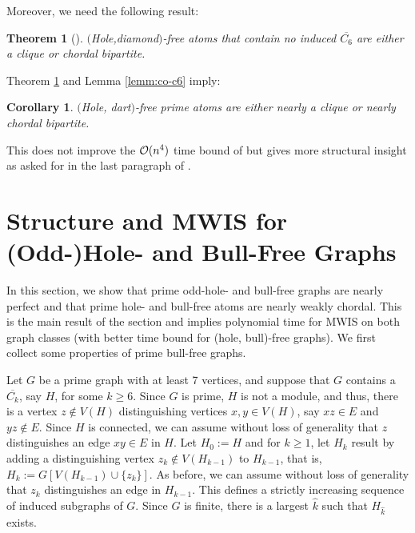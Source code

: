 \documentclass[11pt]{article}
\newcommand{\0}{\text{ has a co-join to }}
\newcommand{\1}{\text{ has a join to }}
\newtheorem{theo}{Theorem}
\newtheorem{coro}{Corollary}
\begin{document}
Moreover, we need the following result:

\begin{theo}[\cite{BerBraGiaMaf2012}]\label{holediamondcoC6freeatoms}   
$($Hole,diamond$)$-free atoms that contain no induced $\overline{C_6}$ are either a clique or chordal bipartite. 
\end{theo}

Theorem \ref{holediamondcoC6freeatoms} and Lemma \ref{lemm:co-c6} imply: 

\begin{coro}\label{holedartfrstructure}
$($Hole, dart$)$-free prime atoms are either nearly a clique or nearly chordal bipartite. 
\end{coro}

This does not improve the ${\cal O}(n^4)$ time bound of \cite{BasChaKar2012} but gives more structural insight as asked for in the last paragraph of \cite{BasChaKar2012}.  
 
\section{Structure and MWIS for (Odd-)Hole- and Bull-Free Graphs}\label{holebullfr}

In this section, we show that prime odd-hole- and bull-free graphs are nearly perfect and that prime hole- and bull-free atoms are nearly weakly chordal. This is the main result of the section and implies polynomial time for MWIS on both graph classes (with better time bound for (hole, bull)-free graphs). We first collect some properties of prime bull-free graphs. 

\medskip

Let $G$ be a prime graph with at least 7 vertices, and suppose that $G$ contains a $\overline{C_k}$, say $H$, for some $k \ge 6$. Since $G$ is prime, $H$ is not a module, and thus, there is a vertex $z \notin V(H)$ distinguishing vertices $x,y \in V(H)$, say $xz \in E$ and $yz \notin E$. Since $H$ is connected, we can assume without loss of generality that $z$ distinguishes an edge $xy \in E$ in $H$. Let $H_0:=H$ and for $k \ge 1$, let $H_k$ result by adding a distinguishing vertex $z_k \notin V(H_{k-1})$ to $H_{k-1}$, that is, $H_k:=G[V(H_{k-1}) \cup \{z_k\}]$. As before, we can assume without loss of generality that $z_k$ distinguishes an edge in $H_{k-1}$. This defines a strictly increasing sequence of induced subgraphs of $G$. Since $G$ is finite, there is a largest $\hat{k}$ such that $H_{\hat{k}}$ exists.    
\end{document}
